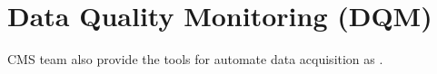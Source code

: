 














\section{Data Quality Monitoring (DQM)}

CMS team also provide the tools for automate data acquisition as \cite{cms_daq}. 